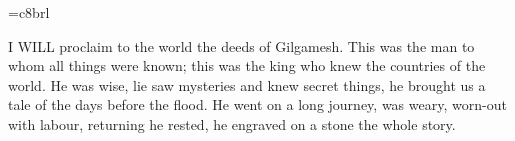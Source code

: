 \documentclass{article}
\begin{document}
\font\brl=c8brl

{\brl
I WILL proclaim to the world the deeds of Gilgamesh. This was the man to whom
all things were known; this was the king who knew the countries of the world. He was
wise, lie saw mysteries and knew secret things, he brought us a tale of the days
before the flood. He went on a long journey, was weary, worn-out with labour,
returning he rested, he engraved on a stone the whole story.
}
\end{document}
